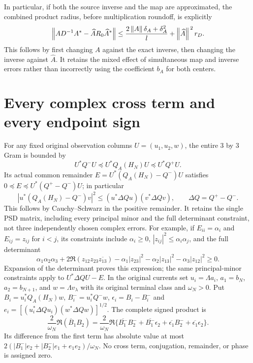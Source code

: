 \documentclass[11pt]{article}
\begin{document}
In particular, if both the source inverse and the map are
approximated, the combined product radius, before multiplication
roundoff, is explicitly
\[
 \left\lVert AD^{-1}A^*-\widehat A R_0\widehat A^*\right\rVert
 \le \frac{2\left\lVert A\right\rVert\delta_A+\delta_A^2}{l}
                  +\left\lVert\widehat A\right\rVert^{\,2}r_D.
\]
This follows by first changing $A$ against the exact inverse,
then changing the inverse against $\widehat A$. It retains the
mixed effect of simultaneous map and inverse errors rather than
incorrectly using the coefficient $b_A$ for both centers.

\section{Every complex cross term and every endpoint sign}

For any fixed original observation columns $U=(u_1,u_2,w)$,
the entire $3$ by $3$ Gram is bounded by
\[
 U^*Q^-U\preceq U^*Q_A(H_N)U\preceq U^*Q^+U.
\]
Its actual common remainder $E=U^*(Q_A(H_N)-Q^-)U$ satisfies
$0\preceq E\preceq U^*(Q^+-Q^-)U$; in particular
\begin{equation}\label{mprec:eq:cross}
 |u^*(Q_A(H_N)-Q^-)v|^2
 \le(u^*\Delta Q u)(v^*\Delta Q v),\qquad\Delta Q=Q^+-Q^-.
\end{equation}
This follows by Cauchy--Schwarz in the positive remainder. It
retains the single PSD matrix, including every principal minor and
the full determinant constraint, not three independently chosen
complex errors. For example, if $E_{ii}=\alpha_i$ and
$E_{ij}=z_{ij}$ for $i<j$, its constraints include $\alpha_i\ge0$,
$|z_{ij}|^2\le\alpha_i\alpha_j$, and the full determinant
\[
 \alpha_1\alpha_2\alpha_3
 +2\Re(z_{12}z_{23}\overline{z_{13}})
 -\alpha_1|z_{23}|^2-\alpha_2|z_{13}|^2-\alpha_3|z_{12}|^2
 \ge0.
\]
Expansion of the determinant proves this expression; the same
principal-minor constraints apply to $U^*\Delta Q U-E$.
In the original currents set
$u_i=\Lambda a_i$, $a_1=b_N$, $a_2=b_{N+1}$, and
$w=\Lambda v_\lambda$ with its original terminal class and
$\omega_N>0$. Put $B_i=u_i^*Q_A(H_N)w$, $B_i^-=u_i^*Q^-w$,
$\epsilon_i=B_i-B_i^-$ and
$e_i=[(u_i^*\Delta Q u_i)(w^*\Delta Q w)]^{1/2}$.
The complete signed product is
\begin{equation}\label{mprec:eq:current}
 \frac{2}{\omega_N}\Re(\overline B_1B_2)
 =\frac{2}{\omega_N}\Re\{
 \overline{B_1^-}B_2^-+\overline{B_1^-}\epsilon_2
 +\overline{\epsilon_1}B_2^-+\overline{\epsilon_1}\epsilon_2\}.
\end{equation}
Its difference from the first term has absolute value at most
$2(|B_1^-|e_2+|B_2^-|e_1+e_1e_2)/\omega_N$.
No cross term, conjugation, remainder, or phase is assigned zero.
\end{document}
